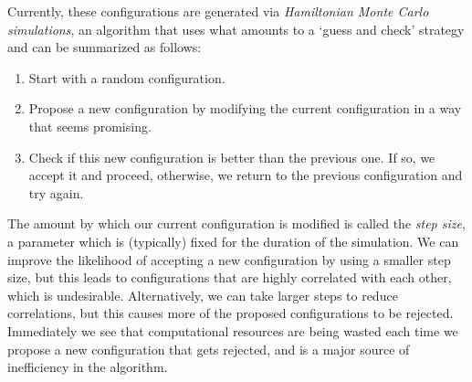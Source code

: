 \begin{doublespace}
%
Currently, these configurations are generated via \emph{Hamiltonian Monte Carlo simulations}, an algorithm that uses 
what amounts to a `guess and check' strategy and can be summarized as follows:
%
\begin{enumerate}
  \item Start with a random configuration.
  \item Propose a new configuration by modifying the current configuration in a way that seems promising.
  \item Check if this new configuration is better than the previous one. If so, we accept it and proceed, otherwise, we
    return to the previous configuration and try again.
\end{enumerate}
%
The amount by which our current configuration is modified is called the \emph{step size}, a parameter which is
(typically) fixed for the duration of the simulation.
%
We can improve the likelihood of accepting a new configuration by using a smaller step size, but this leads to
configurations that are highly correlated with each other, which is undesirable.
%
Alternatively, we can take larger steps to reduce correlations, but this causes more of the proposed configurations to
be rejected.
%
Immediately we see that computational resources are being wasted each time we propose a new configuration that gets
rejected, and is a major source of inefficiency in the algorithm.


\end{doublespace}
